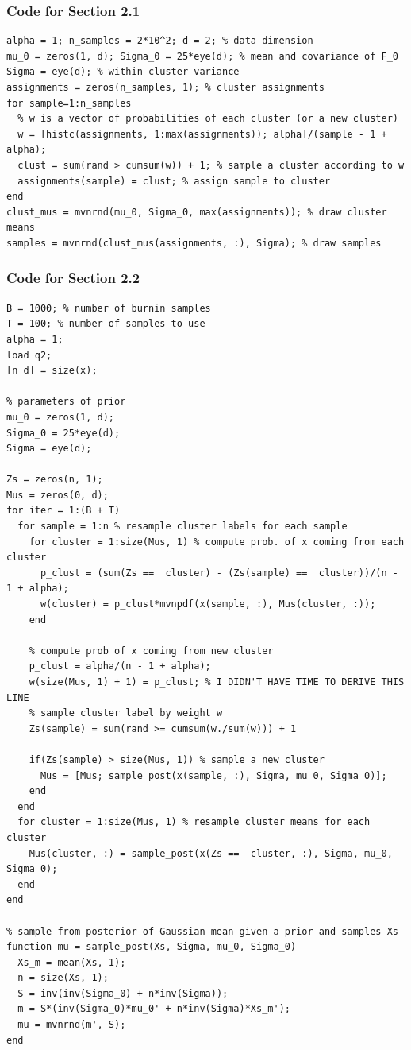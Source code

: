 \documentclass[11pt]{article}
\begin{document}
\subsubsection*{Code for Section 2.1}
\begin{verbatim}
alpha = 1; n_samples = 2*10^2; d = 2; % data dimension
mu_0 = zeros(1, d); Sigma_0 = 25*eye(d); % mean and covariance of F_0
Sigma = eye(d); % within-cluster variance
assignments = zeros(n_samples, 1); % cluster assignments
for sample=1:n_samples
  % w is a vector of probabilities of each cluster (or a new cluster)
  w = [histc(assignments, 1:max(assignments)); alpha]/(sample - 1 + alpha);
  clust = sum(rand > cumsum(w)) + 1; % sample a cluster according to w
  assignments(sample) = clust; % assign sample to cluster
end
clust_mus = mvnrnd(mu_0, Sigma_0, max(assignments)); % draw cluster means
samples = mvnrnd(clust_mus(assignments, :), Sigma); % draw samples
\end{verbatim}

\newpage
\subsubsection*{Code for Section 2.2}
\begin{verbatim}
B = 1000; % number of burnin samples
T = 100; % number of samples to use
alpha = 1;
load q2;
[n d] = size(x);

% parameters of prior
mu_0 = zeros(1, d);
Sigma_0 = 25*eye(d);
Sigma = eye(d);

Zs = zeros(n, 1);
Mus = zeros(0, d);
for iter = 1:(B + T)
  for sample = 1:n % resample cluster labels for each sample
    for cluster = 1:size(Mus, 1) % compute prob. of x coming from each cluster
      p_clust = (sum(Zs ==  cluster) - (Zs(sample) ==  cluster))/(n - 1 + alpha);
      w(cluster) = p_clust*mvnpdf(x(sample, :), Mus(cluster, :));
    end

    % compute prob of x coming from new cluster
    p_clust = alpha/(n - 1 + alpha);
    w(size(Mus, 1) + 1) = p_clust; % I DIDN'T HAVE TIME TO DERIVE THIS LINE
    % sample cluster label by weight w
    Zs(sample) = sum(rand >= cumsum(w./sum(w))) + 1

    if(Zs(sample) > size(Mus, 1)) % sample a new cluster
      Mus = [Mus; sample_post(x(sample, :), Sigma, mu_0, Sigma_0)];
    end
  end
  for cluster = 1:size(Mus, 1) % resample cluster means for each cluster
    Mus(cluster, :) = sample_post(x(Zs ==  cluster, :), Sigma, mu_0, Sigma_0);
  end
end

% sample from posterior of Gaussian mean given a prior and samples Xs
function mu = sample_post(Xs, Sigma, mu_0, Sigma_0)
  Xs_m = mean(Xs, 1);
  n = size(Xs, 1);
  S = inv(inv(Sigma_0) + n*inv(Sigma));
  m = S*(inv(Sigma_0)*mu_0' + n*inv(Sigma)*Xs_m');
  mu = mvnrnd(m', S);
end
\end{verbatim}
\end{document}
